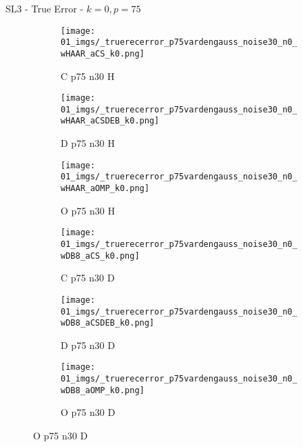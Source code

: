 \begin{frame}{SL3 - True Error - $k=0,p=75$}{}
\begin{figure}
\vspace{5pt}

\begin{subfigure}{0.13\textwidth}
\texttt{[image: 01\_imgs/\_truerecerror\_p75vardengauss\_noise30\_n0\_wHAAR\_aCS\_k0.png]}
\caption*{\tiny C p75 n30 H}
\end{subfigure}
\begin{subfigure}{0.13\textwidth}
\texttt{[image: 01\_imgs/\_truerecerror\_p75vardengauss\_noise30\_n0\_wHAAR\_aCSDEB\_k0.png]}
\caption*{\tiny D p75 n30 H}
\end{subfigure}
\begin{subfigure}{0.13\textwidth}
\texttt{[image: 01\_imgs/\_truerecerror\_p75vardengauss\_noise30\_n0\_wHAAR\_aOMP\_k0.png]}
\caption*{\tiny O p75 n30 H}
\end{subfigure}
\begin{subfigure}{0.13\textwidth}
\texttt{[image: 01\_imgs/\_truerecerror\_p75vardengauss\_noise30\_n0\_wDB8\_aCS\_k0.png]}
\caption*{\tiny C p75 n30 D}
\end{subfigure}
\begin{subfigure}{0.13\textwidth}
\texttt{[image: 01\_imgs/\_truerecerror\_p75vardengauss\_noise30\_n0\_wDB8\_aCSDEB\_k0.png]}
\caption*{\tiny D p75 n30 D}
\end{subfigure}
\begin{subfigure}{0.13\textwidth}
\texttt{[image: 01\_imgs/\_truerecerror\_p75vardengauss\_noise30\_n0\_wDB8\_aOMP\_k0.png]}
\caption*{\tiny O p75 n30 D}
\end{subfigure}
\end{figure}
\end{frame}


